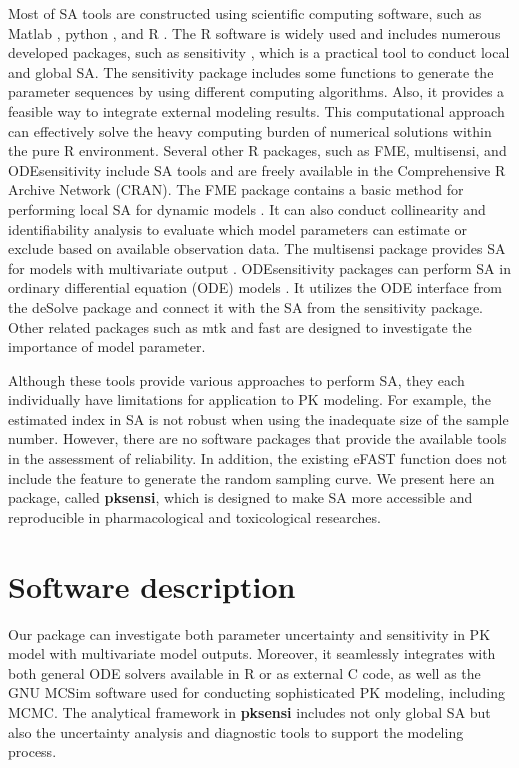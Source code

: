\documentclass[preprint,12pt, a4paper]{elsarticle}
\begin{document}
Most of SA tools are constructed using scientific computing software, 
such as Matlab \cite{pianosi2015matlab},
python \cite{herman2017salib}, and R \cite{iooss2017introduction}. 
The R software is widely used and includes numerous developed packages,
such as sensitivity \cite{R-sensitivity}, 
which is a practical tool to conduct local and
global SA. The sensitivity package includes some functions to
generate the parameter sequences by using different computing
algorithms. Also, it provides a feasible way to integrate external
modeling results. This computational approach can effectively solve the
heavy computing burden of numerical solutions within the pure R
environment. Several other R packages, such as FME,
multisensi, and ODEsensitivity include SA tools and
are freely available in the Comprehensive R Archive Network (CRAN). The
FME package contains a basic method for performing local SA
for dynamic models \cite{JSSv033i03}. It can also conduct collinearity
and identifiability analysis to evaluate which model parameters can
estimate or exclude based on available observation data. The
multisensi package provides SA for models with multivariate
output \cite{R-multisensi}. ODEsensitivity packages can perform SA in
ordinary differential equation (ODE) models \cite{R-ODEsensitivity}. It
utilizes the ODE interface from the deSolve package and
connect it with the SA from the sensitivity package. Other
related packages such as mtk \cite{RJ-2015-031} and
fast \cite{R-fast} are designed to investigate the importance
of model parameter. 

Although these tools provide various approaches to perform SA, they each
individually have limitations for application to PK modeling. For
example, the estimated index in SA is not robust when using the
inadequate size of the sample number. However, there are no software
packages that provide the available tools in the assessment of
reliability. In addition, the existing eFAST function does not include
the feature to generate the random sampling curve. We present here an
package, called \textbf{pksensi}, which is designed to make SA more
accessible and reproducible in pharmacological and toxicological
researches. 

\section{Software description}

Our package can investigate both parameter uncertainty and
sensitivity in PK model with multivariate model outputs. Moreover, it
seamlessly integrates with both general ODE solvers available in R or as
external C code, as well as the GNU MCSim software used for conducting
sophisticated PK modeling, including MCMC. The analytical framework in
\textbf{pksensi} includes not only global SA but also the uncertainty
analysis and diagnostic tools to support the modeling process.
\end{document}
